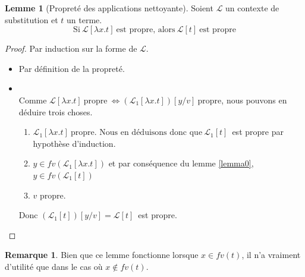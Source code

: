 \documentclass[11pt,a4paper]{article}
\theoremstyle{definition}
\newtheorem{lemma}[theorem]{Lemme}
\newtheorem*{remark}{Remarque}
\begin{document}
\begin{lemma}[Propreté des applications nettoyante]
  \label{prdbgc}
  Soient $\mathcal{L}$ un contexte de substitution et $t$ un terme.
 \[
   \text{Si}~\mathcal{L}[\lambda x.t]~\text{est propre, alors}~\mathcal{L}[t]~\text{est propre}
 \]
\end{lemma}
\begin{proof}
  Par induction sur la forme de $\mathcal{L}$.
  \begin{itemize}
    \item {} Par définition de la propreté.
    \item {}\\
      Comme $\mathcal{L}[\lambda x.t]~\text{propre}~\Leftrightarrow (\mathcal{L}_1[\lambda x.t])[y/v]~\text{propre}$, nous pouvons en déduire trois choses.
      \begin{enumerate}
        \item $\mathcal{L}_1[\lambda x.t]~\text{propre. Nous en déduisons donc que}~\mathcal{L}_1[t]$~est propre par hypothèse d'induction.
        \item $y\in fv(\mathcal{L}_1[\lambda x.t])$ et par conséquence du lemme \ref{lemma0}, $y \in fv(\mathcal{L}_1[t])$
        \item $v$ propre.
      \end{enumerate}
      Donc $(\mathcal{L}_1[t])[y/v] = \mathcal{L}[t]$~est propre.
  \end{itemize}
\end{proof}
\begin{remark}
  Bien que ce lemme fonctionne lorsque $x \in fv(t)$, il n'a vraiment d'utilité que dans le cas où $x \notin fv(t)$.
\end{remark}
\end{document}
